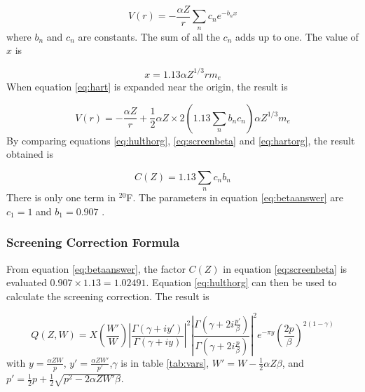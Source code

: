 \documentclass[../MaxHughesThesis.tex]{subfiles}
\begin{document}
\begin{equation}
	V(r) = -\frac{\alpha Z}{r}\sum_{n}c_{n}e^{-b_{n} x}
	\label{eq:hart}
\end{equation}
where $b_{n}$ and $c_{n}$ are constants.
The sum of all the $c_{n}$ adds up to one.
The value of $x$ is \cite{Bya56} %

\begin{equation}
	x = 1.13 \alpha Z^{1/3} r m_{e}
	\label{eq:screeningx}
\end{equation}
When equation \ref{eq:hart} is expanded near the origin, the result is %

\begin{equation}
	V(r) = - \frac{\alpha Z}{r} + \frac{1}{2} \alpha Z \times 2 (1.13 \sum_{n} b_{n} c_{n}) \alpha Z^{1/3} m_{e} 
	\label{eq:hartorg}
\end{equation}
By comparing equations \ref{eq:hulthorg}, \ref{eq:screenbeta} and \ref{eq:hartorg}, the result obtained is %

\begin{equation}
	C(Z) = 1.13 \sum_{n} c_{n} b_{n}
	\label{eq:betaanswer}
\end{equation} 
There is only one term in $^{20}$F. 
The parameters in equation \ref{eq:betaanswer} are $c_{1} = 1$ and $b_{1} = 0.907$ \cite{Bya56}.

\subsubsection{Screening Correction Formula}
From equation \ref{eq:betaanswer}, the factor $C(Z)$ in equation \ref{eq:screenbeta} is evaluated $0.907 \times 1.13 = 1.02491$.
Equation \ref{eq:hulthorg} can then be used to calculate the screening correction.
The result is \cite{Buh84} %

\begin{equation}
	Q(Z,W) = X(\frac{W'}{W})|\frac{\Gamma(\gamma + i y')}{\Gamma(\gamma+ i y)}|^{2}|\frac{\Gamma(\gamma + 2 i \frac{p'}{\beta})}{\Gamma(\gamma + 2 i \frac{p}{\beta})}|^{2}e^{-\pi y}(\frac{2p}{\beta})^{2(1 - \gamma)}
	\label{eq:screeningQ}
\end{equation}
with $y = \frac{\alpha Z W}{p}$, $y' = \frac{\alpha Z W'}{p'}$,$ \gamma$ is in table \ref{tab:vars}, $W' = W - \frac{1}{2}\alpha Z \beta$, and $p' = \frac{1}{2}p + \frac{1}{2}\sqrt{p^{2} - 2 \alpha Z W' \beta}$.
\end{document}
